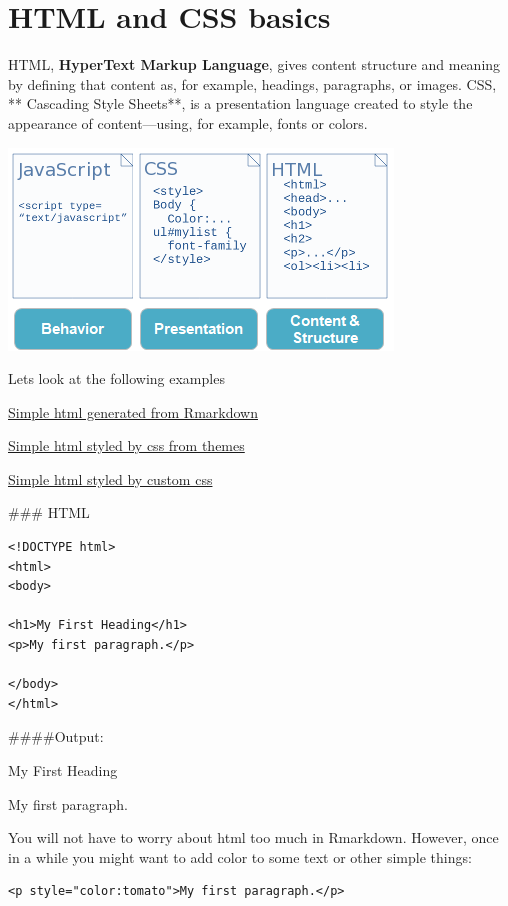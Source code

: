 \documentclass[
]{book}
\begin{document}
\hypertarget{html-and-css-basics}{%
\section{HTML and CSS basics}\label{html-and-css-basics}}

HTML, \textbf{HyperText Markup Language}, gives content structure and meaning by defining that content as, for example, headings, paragraphs, or images. CSS, ** Cascading Style Sheets**, is a presentation language created to style the appearance of content---using, for example, fonts or colors.

\includegraphics{img/js_css_html.png}

Lets look at the following examples

\href{data/case_study_default.html}{Simple html generated from Rmarkdown}

\href{data/case_study_theme.html}{Simple html styled by css from themes}

\href{data/case_study_extreme.html}{Simple html styled by custom css}

\#\#\# HTML

\begin{verbatim}
<!DOCTYPE html>
<html>
<body>

<h1>My First Heading</h1>
<p>My first paragraph.</p>

</body>
</html>
\end{verbatim}

\#\#\#\#Output:

My First Heading

My first paragraph.

You will not have to worry about html too much in Rmarkdown. However,
once in a while you might want to add color to some text or other simple things:

\begin{verbatim}
<p style="color:tomato">My first paragraph.</p>
\end{verbatim}
\end{document}
